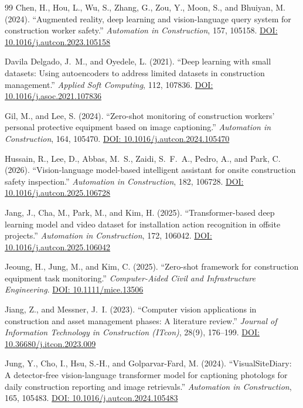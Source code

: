 \documentclass[10pt,letterpaper]{article}
\begin{document}
\begin{thebibliography}{99}
 Chen, H., Hou, L., Wu, S., Zhang, G., Zou, Y., Moon, S., and Bhuiyan, M. (2024). ``Augmented reality, deep learning and vision-language query system for construction worker safety.'' \textit{Automation in Construction}, 157, 105158. \href{https://doi.org/10.1016/j.autcon.2023.105158}{DOI: 10.1016/j.autcon.2023.105158}

 Davila Delgado, J.~M., and Oyedele, L. (2021). ``Deep learning with small datasets: Using autoencoders to address limited datasets in construction management.'' \textit{Applied Soft Computing}, 112, 107836. \href{https://doi.org/10.1016/j.asoc.2021.107836}{DOI: 10.1016/j.asoc.2021.107836}

 Gil, M., and Lee, S. (2024). ``Zero-shot monitoring of construction workers' personal protective equipment based on image captioning.'' \textit{Automation in Construction}, 164, 105470. \href{https://doi.org/10.1016/j.autcon.2024.105470}{DOI: 10.1016/j.autcon.2024.105470}

 Hussain, R., Lee, D., Abbas, M.~S., Zaidi, S.~F.~A., Pedro, A., and Park, C. (2026). ``Vision-language model-based intelligent assistant for onsite construction safety inspection.'' \textit{Automation in Construction}, 182, 106728. \href{https://doi.org/10.1016/j.autcon.2025.106728}{DOI: 10.1016/j.autcon.2025.106728}

 Jang, J., Cha, M., Park, M., and Kim, H. (2025). ``Transformer-based deep learning model and video dataset for installation action recognition in offsite projects.'' \textit{Automation in Construction}, 172, 106042. \href{https://doi.org/10.1016/j.autcon.2025.106042}{DOI: 10.1016/j.autcon.2025.106042}

 Jeoung, H., Jung, M., and Kim, C. (2025). ``Zero-shot framework for construction equipment task monitoring.'' \textit{Computer-Aided Civil and Infrastructure Engineering}. \href{https://doi.org/10.1111/mice.13506}{DOI: 10.1111/mice.13506}

 Jiang, Z., and Messner, J.~I. (2023). ``Computer vision applications in construction and asset management phases: A literature review.'' \textit{Journal of Information Technology in Construction (ITcon)}, 28(9), 176--199. \href{https://doi.org/10.36680/j.itcon.2023.009}{DOI: 10.36680/j.itcon.2023.009}

 Jung, Y., Cho, I., Hsu, S.-H., and Golparvar-Fard, M. (2024). ``VisualSiteDiary: A detector-free vision-language transformer model for captioning photologs for daily construction reporting and image retrievals.'' \textit{Automation in Construction}, 165, 105483. \href{https://doi.org/10.1016/j.autcon.2024.105483}{DOI: 10.1016/j.autcon.2024.105483}


\end{thebibliography}
\end{document}
